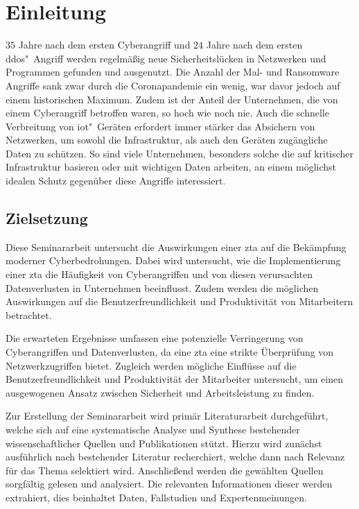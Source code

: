 \section{Einleitung}\label{sec:einleitung}

$35$ Jahre nach dem ersten Cyberangriff\autocite[\vglf][]{shackelford-2018} und $24$ Jahre nach dem ersten \ac{ddos}"~Angriff\autocite[\vglf][]{mit-2019} werden regelmäßig neue Sicherheitslücken in Netzwerken und Programmen gefunden und ausgenutzt.
Die Anzahl der Mal- und Ransomware Angriffe sank zwar durch die Coronapandemie ein wenig, war davor jedoch auf einem historischen Maximum.\autocites[][]{statista-malware}[][]{statista-ransomware}
Zudem ist der Anteil der Unternehmen, die von einem Cyberangriff betroffen waren, so hoch wie noch nie.\autocite{statista-share-ransomware}
Auch die schnelle Verbreitung von \ac{iot}"~Geräten erfordert immer stärker das Absichern von Netzwerken, um sowohl die Infrastruktur, als auch den Geräten zugängliche Daten zu schützen.\autocite[\vglf][]{syed:2022}
So sind viele Unternehmen, besonders solche die auf kritischer Infrastruktur basieren oder mit wichtigen Daten arbeiten, an einem möglichst idealen Schutz gegenüber diese Angriffe interessiert.

\subsection{Zielsetzung}\label{subsec:zielsetzung}
Diese Seminararbeit untersucht die Auswirkungen einer \ac{zta} auf die Bekämpfung moderner Cyberbedrohungen.
Dabei wird untersucht, wie die Implementierung einer \ac{zta} die Häufigkeit von Cyberangriffen und von diesen verursachten Datenverlusten in Unternehmen beeinflusst.
Zudem werden die möglichen Auswirkungen auf die Benutzerfreundlichkeit und Produktivität von Mitarbeitern betrachtet.

Die erwarteten Ergebnisse umfassen eine potenzielle Verringerung von Cyberangriffen und Datenverlusten, da eine \ac{zta} eine strikte Überprüfung von Netzwerkzugriffen bietet.
Zugleich werden mögliche Einflüsse auf die Benutzerfreundlichkeit und Produktivität der Mitarbeiter untersucht, um einen ausgewogenen Ansatz zwischen Sicherheit und Arbeitsleistung zu finden.

Zur Erstellung der Seminararbeit wird primär Literaturarbeit durchgeführt, welche sich auf eine systematische Analyse und Synthese bestehender wissenschaftlicher Quellen und Publikationen stützt.
Hierzu wird zunächst ausführlich nach bestehender Literatur recherchiert, welche dann nach Relevanz für das Thema selektiert wird.
Anschließend werden die gewählten Quellen sorgfältig gelesen und analysiert.
Die relevanten Informationen dieser werden extrahiert, dies beinhaltet Daten, Fallstudien und Expertenmeinungen.

